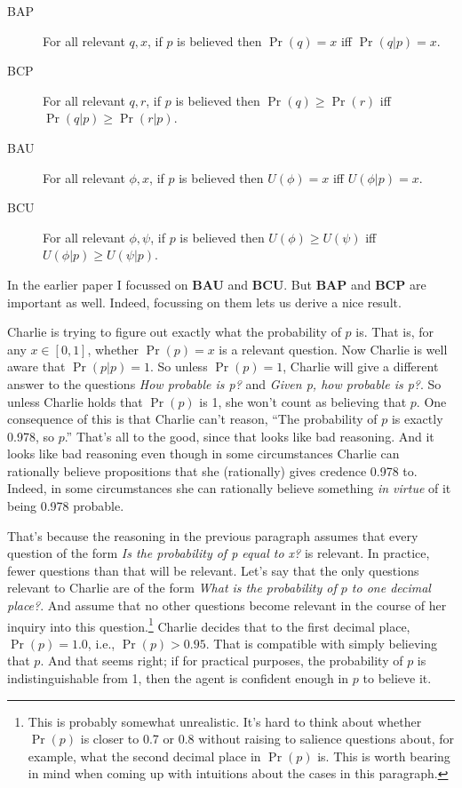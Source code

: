 \begin{description}
\item[BAP] For all relevant $q, x$, if $p$ is believed then $\Pr(q) = x$ iff $\Pr(q | p) = x$.
\item[BCP] For all relevant $q, r$, if $p$ is believed then $\Pr(q) \geq \Pr(r)$ iff $\Pr(q | p) \geq \Pr(r | p)$.
\item[BAU] For all relevant $\phi, x$, if $p$ is believed then $U(\phi) = x$ iff $U(\phi | p) = x$.
\item[BCU] For all relevant $\phi, \psi$, if $p$ is believed then $U(\phi) \geq U(\psi)$ iff $U(\phi | p) \geq U(\psi | p)$.
\end{description}

\noindent In the earlier paper I focussed on \textbf{BAU} and \textbf{BCU}. But \textbf{BAP} and \textbf{BCP} are important as well. Indeed, focussing on them lets us derive a nice result. 

Charlie is trying to figure out exactly what the probability of $p$ is. That is, for any $x \in [0, 1]$, whether $\Pr(p) = x$ is a relevant question. Now Charlie is well aware that $\Pr(p | p) = 1$. So unless $\Pr(p) = 1$, Charlie will give a different answer to the questions \textit{How probable is p?} and \textit{Given p, how probable is p?}. So unless Charlie holds that $\Pr(p)$ is 1, she won't count as believing that $p$. One consequence of this is that Charlie can't reason, ``The probability of $p$ is exactly 0.978, so $p$.'' That's all to the good, since that looks like bad reasoning. And it looks like bad reasoning even though in some circumstances Charlie can rationally believe propositions that she (rationally) gives credence 0.978 to. Indeed, in some circumstances she can rationally believe something \textit{in virtue} of it being 0.978 probable.

That's because the reasoning in the previous paragraph assumes that every question of the form \textit{Is the probability of p equal to x?} is relevant. In practice, fewer questions than that will be relevant. Let's say that the only questions relevant to Charlie are of the form \textit{What is the probability of $p$ to one decimal place?}. And assume that no other questions become relevant in the course of her inquiry into this question.\footnote{This is probably somewhat unrealistic. It's hard to think about whether $\Pr(p)$ is closer to 0.7 or 0.8 without raising to salience questions about, for example, what the second decimal place in $\Pr(p)$ is. This is worth bearing in mind when coming up with intuitions about the cases in this paragraph.} Charlie decides that to the first decimal place, $\Pr(p) = 1.0$, i.e., $\Pr(p) > 0.95$. That is compatible with simply believing that $p$. And that seems right; if for practical purposes, the probability of $p$ is indistinguishable from 1, then the agent is confident enough in $p$ to believe it.

